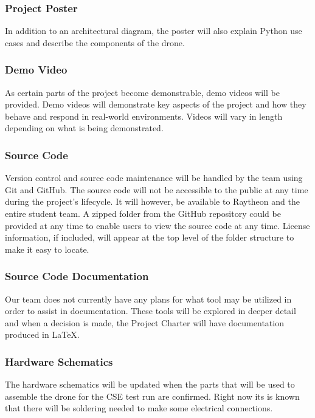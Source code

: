 \subsubsection{Project Poster}
In addition to an architectural diagram, the poster will also explain Python use cases and describe the components of the drone.


\subsubsection{Demo Video}
As certain parts of the project become demonstrable, demo videos will be provided. Demo videos will demonstrate key aspects of the project and how they behave and respond in real-world environments. Videos will vary in length depending on what is being demonstrated.

\subsubsection{Source Code}
Version control and source code maintenance will be handled by the team using Git and GitHub. The source code will not be accessible to the public at any time during the project's lifecycle. It will however, be available to Raytheon and the entire student team. A zipped folder from the GitHub repository could be provided at any time to enable users to view the source code at any time. License information, if included, will appear at the top level of the folder structure to make it easy to locate.

\subsubsection{Source Code Documentation}
Our team does not currently have any plans for what tool may be utilized in order to assist in documentation. These tools will be explored in deeper detail and when a decision is made, the Project Charter will have documentation produced in LaTeX.

\subsubsection{Hardware Schematics}
The hardware schematics will be updated when the parts that will be used to assemble the drone for the CSE test run are confirmed. Right now its is known that there will be soldering needed to make some electrical connections.

